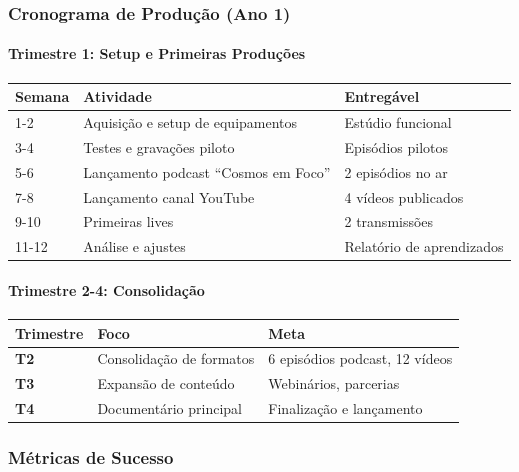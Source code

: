 \subsubsection{Cronograma de Produção (Ano 1)}

\paragraph{Trimestre 1: Setup e Primeiras Produções}

\bigskip\noindent
\begin{tabular}{p{}p{}p{}}
\toprule
Semana & Atividade & Entregável \\
\hline
1-2 & Aquisição e setup de equipamentos & Estúdio funcional \\
3-4 & Testes e gravações piloto & Episódios pilotos \\
5-6 & Lançamento podcast ``Cosmos em Foco'' & 2 episódios no ar \\
7-8 & Lançamento canal YouTube & 4 vídeos publicados \\
9-10 & Primeiras lives & 2 transmissões \\
11-12 & Análise e ajustes & Relatório de aprendizados \\
\bottomrule
\end{tabular}

\bigskip

\paragraph{Trimestre 2-4: Consolidação}

\bigskip\noindent
\begin{tabular}{p{}p{}p{}}
\toprule
Trimestre & Foco & Meta \\
\hline
\textbf{T2} & Consolidação de formatos & 6 episódios podcast, 12 vídeos \\
\textbf{T3} & Expansão de conteúdo & Webinários, parcerias \\
\textbf{T4} & Documentário principal & Finalização e lançamento \\
\bottomrule
\end{tabular}

\bigskip

\subsubsection{Métricas de Sucesso}

